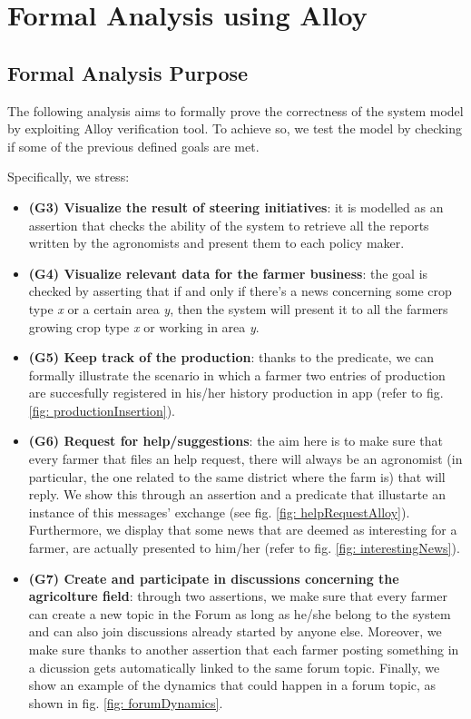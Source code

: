 \documentclass[table, 12pt]{article}
\begin{document}
\section{Formal Analysis using Alloy}
\subsection{Formal Analysis Purpose}
The following analysis aims to formally prove the correctness of the system model by exploiting Alloy verification tool. To achieve so, we test the model by checking if some of the previous defined goals are met. 

Specifically, we stress:
\begin{itemize}
    \item \textbf{(G3) Visualize the result of steering initiatives}: it is modelled as an assertion that checks the ability of the system to retrieve all the reports written by the agronomists and present them to each policy maker.
    \item \textbf{(G4) Visualize relevant data for the farmer business}: the goal is checked by asserting that if and only if there's a news concerning some crop type \textit{x} or a certain area \textit{y}, then the system will present it to all the farmers growing crop type \textit{x} or working in area \textit{y}.
    \item \textbf{(G5) Keep track of the production}: thanks to the predicate, we can formally illustrate the scenario in which a farmer two entries of production are succesfully registered in his/her history production in app (refer to fig. \ref{fig: productionInsertion}).
    \item \textbf{(G6) Request for help/suggestions}: the aim here is to make sure that every farmer that files an help request, there will always be an agronomist (in particular, the one related to the same district where the farm is) that will reply. We show this through an assertion and a predicate that illustarte an instance of this messages' exchange (see fig. \ref{fig: helpRequestAlloy}). Furthermore, we display that some news that are deemed as interesting for a farmer, are actually presented to him/her (refer to fig. \ref{fig: interestingNews}).
    \item \textbf{(G7) Create and participate in discussions concerning the agricolture field}: through two assertions, we make sure that every farmer can create a new topic in the Forum as long as he/she belong to the system and can also join discussions already started by anyone else. Moreover, we make sure thanks to another assertion that each farmer posting something in a dicussion gets automatically linked to the same forum topic. Finally, we show an example of the dynamics that could happen in a forum topic, as shown in fig. \ref{fig: forumDynamics}.

\end{itemize}
\end{document}
